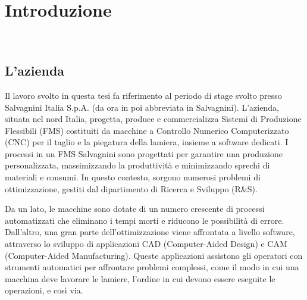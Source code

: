 \chapter{Introduzione}
\label{cap:introduzione}

 \\




\section{L'azienda}

Il lavoro svolto in questa tesi fa riferimento al periodo di stage svolto presso Salvagnini Italia S.p.A. (da ora in poi abbreviata in Salvagnini). L'azienda, situata nel nord Italia, progetta, produce e commercializza Sistemi di Produzione Flessibili (FMS) costituiti da macchine a Controllo Numerico Computerizzato (CNC) per il taglio e la piegatura della lamiera, insieme a software dedicati. I processi in un FMS Salvagnini sono progettati per garantire una produzione personalizzata, massimizzando la produttività e minimizzando sprechi di materiali e consumi. In questo contesto, sorgono numerosi problemi di ottimizzazione, gestiti dal dipartimento di Ricerca e Sviluppo (R\&S).

Da un lato, le macchine sono dotate di un numero crescente di processi automatizzati che eliminano i tempi morti e riducono le possibilità di errore. Dall'altro, una gran parte dell'ottimizzazione viene affrontata a livello software, attraverso lo sviluppo di applicazioni CAD (Computer-Aided Design) e CAM (Computer-Aided Manufacturing). Queste applicazioni assistono gli operatori con strumenti automatici per affrontare problemi complessi, come il modo in cui una macchina deve lavorare le lamiere, l'ordine in cui devono essere eseguite le operazioni, e così via.

